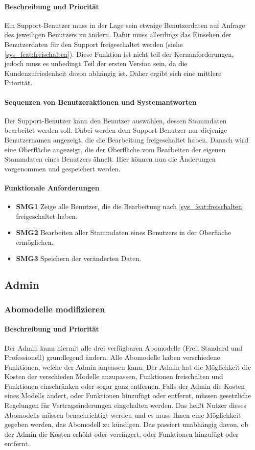 \paragraph{Beschreibung und Priorität}
Ein Support-Benutzer muss in der Lage sein etwaige Benutzerdaten auf Anfrage des jeweiligen Benutzers zu ändern. Dafür muss allerdings das Einsehen der Benutzerdaten für den Support freigeschaltet werden (siehe \ref{sys_feat:freischalten}). Diese Funktion ist nicht teil der Kernanforderungen, jedoch muss es unbedingt Teil der ersten Version sein, da die Kundenzufriedenheit davon abhängig ist. Daher ergibt sich eine mittlere Priorität.
\paragraph{Sequenzen von Benutzeraktionen und Systemantworten}
Der Support-Benutzer kann den Benutzer auswählen, dessen Stammdaten bearbeitet werden soll. Dabei werden dem Support-Benutzer nur diejenige Benutzernamen angezeigt, die die Bearbeitung freigeschaltet haben. Danach wird eine Oberfläche angezeigt, die der Oberfläche vom Bearbeiten der eigenen Stammdaten eines Benutzers ähnelt. Hier können nun die Änderungen vorgenommen und gespeichert werden.
\paragraph{Funktionale Anforderungen}
\begin{itemize}
	\item \textbf{SMG1} Zeige alle Benutzer, die die Bearbeitung nach \ref{sys_feat:freischalten} freigeschaltet haben.
	\item \textbf{SMG2} Bearbeiten aller Stammdaten eines Benutzers in der Oberfläche ermöglichen.
	\item \textbf{SMG3} Speichern der veränderten Daten.
\end{itemize}

\subsection{Admin}
\subsubsection{Abomodelle modifizieren}
\paragraph{Beschreibung und Priorität}
Der Admin kann hiermit alle drei verfügbaren Abomodelle (Frei, Standard und Professionell) grundlegend ändern. Alle Abomodelle haben verschiedene Funktionen, welche der Admin anpassen kann. Der Admin hat die Möglichkeit die Kosten der verschieden Modelle anzupassen, Funktionen freischalten und Funktionen einschränken oder sogar ganz entfernen. Falls der Admin die Kosten eines Modells ändert, oder Funktionen hinzufügt oder entfernt, müssen gesetzliche Regelungen für Vertragsänderungen eingehalten werden. Das heißt Nutzer dieses Abomodells müssen benachrichtigt werden und es muss Ihnen eine Möglichkeit gegeben werden, das Abomodell zu kündigen. Das passiert unabhängig davon, ob der Admin die Kosten erhöht oder verringert, oder Funktionen hinzufügt oder entfernt.
